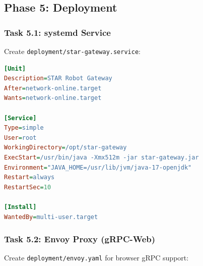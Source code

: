 \subsection{Phase 5: Deployment}

\subsubsection{Task 5.1: systemd Service}

Create \texttt{deployment/star-gateway.service}:

\begin{lstlisting}[language=ini, caption=star-gateway.service]
[Unit]
Description=STAR Robot Gateway
After=network-online.target
Wants=network-online.target

[Service]
Type=simple
User=root
WorkingDirectory=/opt/star-gateway
ExecStart=/usr/bin/java -Xmx512m -jar star-gateway.jar
Environment="JAVA_HOME=/usr/lib/jvm/java-17-openjdk"
Restart=always
RestartSec=10

[Install]
WantedBy=multi-user.target
\end{lstlisting}

\subsubsection{Task 5.2: Envoy Proxy (gRPC-Web)}

Create \texttt{deployment/envoy.yaml} for browser gRPC support:

